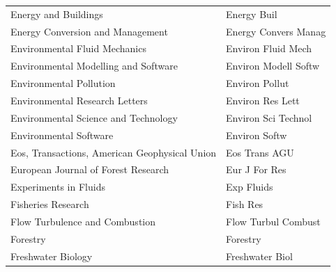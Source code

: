 \begin{longtable}{| p{8 cm} | p{6 cm} |}
Energy and Buildings & Energy Buil \\
Energy Conversion and Management & Energy Convers Manag \\
Environmental Fluid Mechanics & Environ Fluid Mech \\
Environmental Modelling and Software & Environ Modell Softw \\
Environmental Pollution & Environ Pollut \\
Environmental Research Letters & Environ Res Lett \\
Environmental Science and Technology & Environ Sci Technol \\
Environmental Software & Environ Softw \\

Eos, Transactions, American Geophysical Union & Eos Trans AGU \\
European Journal of Forest Research & Eur J For Res \\
Experiments in Fluids & Exp Fluids \\
\hline
Fisheries Research & Fish Res \\
Flow Turbulence and Combustion & Flow Turbul Combust \\
Forestry & Forestry \\
Freshwater Biology & Freshwater Biol \\
\hline
\end{longtable}

\pagebreak[4]

